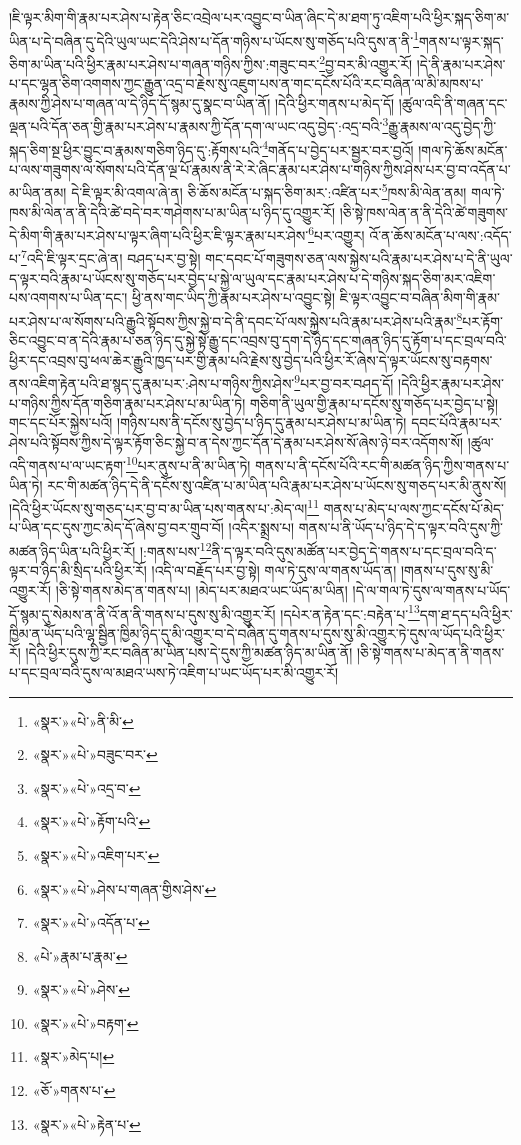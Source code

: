 །ཇི་ལྟར་མིག་གི་རྣམ་པར་ཤེས་པ་རྟེན་ཅིང་འབྲེལ་པར་འབྱུང་བ་ཡིན་ཞིང་དེ་མ་ཐག་ཏུ་འཇིག་པའི་ཕྱིར་སྐད་ཅིག་མ་ཡིན་པ་དེ་བཞིན་དུ་དེའི་ཡུལ་ཡང་དེའི་ཤེས་པ་དོན་གཉིས་པ་ཡོངས་སུ་གཅོད་པའི་དུས་ན་ནི་\footnote{«སྣར་»«པེ་»ནི་མི་}གནས་པ་ལྟར་སྐད་ཅིག་མ་ཡིན་པའི་ཕྱིར་རྣམ་པར་ཤེས་པ་གཞན་གཉིས་ཀྱིས་:གཟུང་བར་\footnote{«སྣར་»«པེ་»བཟུང་བར་}བྱ་བར་མི་འགྱུར་རོ། །དེ་ནི་རྣམ་པར་ཤེས་པ་དང་ལྷན་ཅིག་འགགས་ཀྱང་རྒྱུན་འདྲ་བ་རྗེས་སུ་འཇུག་པས་ན་གང་དངོས་པོའི་རང་བཞིན་ལ་མི་མཁས་པ་རྣམས་ཀྱི་ཤེས་པ་གཞན་ལ་དེ་ཉིད་དོ་སྙམ་དུ་སྣང་བ་ཡིན་ནོ། །དེའི་ཕྱིར་གནས་པ་མེད་དོ། །ཚུལ་འདི་ནི་གཞན་དང་ལྡན་པའི་དོན་ཅན་གྱི་རྣམ་པར་ཤེས་པ་རྣམས་ཀྱི་དོན་དག་ལ་ཡང་འདུ་བྱེད་:འདྲ་བའི་\footnote{«སྣར་»«པེ་»འདྲ་བ་}རྒྱུ་རྣམས་ལ་འདུ་བྱེད་ཀྱི་སྐད་ཅིག་སྔ་ཕྱིར་བྱུང་བ་རྣམས་གཅིག་ཉིད་དུ་:རྟོགས་པའི་\footnote{«སྣར་»«པེ་»རྟོག་པའི་}གནོད་པ་བྱེད་པར་སྦྱར་བར་བྱའོ། །གལ་ཏེ་ཆོས་མངོན་པ་ལས་གཟུགས་ལ་སོགས་པའི་དོན་ལྔ་པོ་རྣམས་ནི་རེ་རེ་ཞིང་རྣམ་པར་ཤེས་པ་གཉིས་ཀྱིས་ཤེས་པར་བྱ་བ་འདོན་པ་མ་ཡིན་ནམ། དེ་ཇི་ལྟར་མི་འགལ་ཞེ་ན། ཅི་ཆོས་མངོན་པ་སྐད་ཅིག་མར་:འཛིན་པར་\footnote{«སྣར་»«པེ་»འཇིག་པར་}ཁས་མི་ལེན་ནམ། གལ་ཏེ་ཁས་མི་ལེན་ན་ནི་དེའི་ཚེ་བདེ་བར་གཤེགས་པ་མ་ཡིན་པ་ཉིད་དུ་འགྱུར་རོ། །ཅི་སྟེ་ཁས་ལེན་ན་ནི་དེའི་ཚེ་གཟུགས་དེ་མིག་གི་རྣམ་པར་ཤེས་པ་ལྟར་ཞིག་པའི་ཕྱིར་ཇི་ལྟར་རྣམ་པར་ཤེས་\footnote{«སྣར་»«པེ་»ཤེས་པ་གཞན་གྱིས་ཤེས་}པར་འགྱུར། འོ་ན་ཆོས་མངོན་པ་ལས་:འདོད་པ་\footnote{«སྣར་»«པེ་»འདོན་པ་}འདི་ཇི་ལྟར་དྲང་ཞེ་ན། བཤད་པར་བྱ་སྟེ། གང་དབང་པོ་གཟུགས་ཅན་ལས་སྐྱེས་པའི་རྣམ་པར་ཤེས་པ་དེ་ནི་ཡུལ་ད་ལྟར་བའི་རྣམ་པ་ཡོངས་སུ་གཅོད་པར་བྱེད་པ་སྐྱེ་ལ་ཡུལ་དང་རྣམ་པར་ཤེས་པ་དེ་གཉིས་སྐད་ཅིག་མར་འཇིག་པས་འགགས་པ་ཡིན་དང་། ཕྱི་ནས་གང་ཡིད་ཀྱི་རྣམ་པར་ཤེས་པ་འབྱུང་སྟེ། ཇི་ལྟར་འབྱུང་བ་བཞིན་མིག་གི་རྣམ་པར་ཤེས་པ་ལ་སོགས་པའི་རྒྱུའི་སྟོབས་ཀྱིས་སྐྱེ་བ་དེ་ནི་དབང་པོ་ལས་སྐྱེས་པའི་རྣམ་པར་ཤེས་པའི་རྣམ་\footnote{«པེ་»རྣམ་པ་རྣམ་}པར་རྟོག་ཅིང་འབྱུང་བ་ན་དེའི་རྣམ་པ་ཅན་ཉིད་དུ་སྐྱེ་སྟེ་རྒྱུ་དང་འབྲས་བུ་དག་དེ་ཉིད་དང་གཞན་ཉིད་དུ་རྟོག་པ་དང་བྲལ་བའི་ཕྱིར་དང་འབྲས་བུ་ཕལ་ཆེར་རྒྱུའི་ཁྱད་པར་གྱི་རྣམ་པའི་རྗེས་སུ་བྱེད་པའི་ཕྱིར་རོ་ཞེས་དེ་ལྟར་ཡོངས་སུ་བརྟགས་ནས་འཇིག་རྟེན་པའི་ཐ་སྙད་དུ་རྣམ་པར་:ཤེས་པ་གཉིས་ཀྱིས་ཤེས་\footnote{«སྣར་»«པེ་»ཤེས་}པར་བྱ་བར་བཤད་དོ། །དེའི་ཕྱིར་རྣམ་པར་ཤེས་པ་གཉིས་ཀྱིས་དོན་གཅིག་རྣམ་པར་ཤེས་པ་མ་ཡིན་ཏེ། གཅིག་ནི་ཡུལ་གྱི་རྣམ་པ་དངོས་སུ་གཅོད་པར་བྱེད་པ་སྟེ། གང་དང་པོར་སྐྱེས་པའོ། །གཉིས་པས་ནི་དངོས་སུ་བྱེད་པ་ཉིད་དུ་རྣམ་པར་ཤེས་པ་མ་ཡིན་ཏེ། དབང་པོའི་རྣམ་པར་ཤེས་པའི་སྟོབས་ཀྱིས་དེ་ལྟར་རྟོག་ཅིང་སྐྱེ་བ་ན་དེས་ཀྱང་དོན་དེ་རྣམ་པར་ཤེས་སོ་ཞེས་ཉེ་བར་འདོགས་སོ། །ཚུལ་འདི་གནས་པ་ལ་ཡང་རྟག་\footnote{«སྣར་»«པེ་»བརྟག་}པར་ནུས་པ་ནི་མ་ཡིན་ཏེ། གནས་པ་ནི་དངོས་པོའི་རང་གི་མཚན་ཉིད་ཀྱིས་གནས་པ་ཡིན་ཏེ། རང་གི་མཚན་ཉིད་དེ་ནི་དངོས་སུ་འཛིན་པ་མ་ཡིན་པའི་རྣམ་པར་ཤེས་པ་ཡོངས་སུ་གཅད་པར་མི་ནུས་སོ། །དེའི་ཕྱིར་ཡོངས་སུ་གཅད་པར་བྱ་བ་མ་ཡིན་པས་གནས་པ་:མེད་ལ།\footnote{«སྣར་»མེད་པ།} གནས་པ་མེད་པ་ལས་ཀྱང་དངོས་པོ་མེད་པ་ཡིན་དང་དུས་ཀྱང་མེད་དོ་ཞེས་བྱ་བར་གྲུབ་བོ། །འདིར་སྨྲས་པ། གནས་པ་ནི་ཡོད་པ་ཉིད་དེ་ད་ལྟར་བའི་དུས་ཀྱི་མཚན་ཉིད་ཡིན་པའི་ཕྱིར་རོ། །:གནས་པས་\footnote{«ཅོ་»གནས་པ་}ནི་ད་ལྟར་བའི་དུས་མཚོན་པར་བྱེད་དེ་གནས་པ་དང་བྲལ་བའི་ད་ལྟར་བ་ཉིད་མི་སྲིད་པའི་ཕྱིར་རོ། །འདི་ལ་བརྗོད་པར་བྱ་སྟེ། གལ་ཏེ་དུས་ལ་གནས་ཡོད་ན། །གནས་པ་དུས་སུ་མི་འགྱུར་རོ། །ཅི་སྟེ་གནས་མེད་ན་གནས་པ། །མེད་པར་མཐའ་ཡང་ཡོད་མ་ཡིན། །དེ་ལ་གལ་ཏེ་དུས་ལ་གནས་པ་ཡོད་དོ་སྙམ་དུ་སེམས་ན་ནི་འོ་ན་ནི་གནས་པ་དུས་སུ་མི་འགྱུར་རོ། །དཔེར་ན་རྟེན་དང་:བརྟེན་པ་\footnote{«སྣར་»«པེ་»རྟེན་པ་}དག་ཐ་དད་པའི་ཕྱིར་ཁྱིམ་ན་ཡོད་པའི་ལྷ་སྦྱིན་ཁྱིམ་ཉིད་དུ་མི་འགྱུར་བ་དེ་བཞིན་དུ་གནས་པ་དུས་སུ་མི་འགྱུར་ཏེ་དུས་ལ་ཡོད་པའི་ཕྱིར་རོ། །དེའི་ཕྱིར་དུས་ཀྱི་རང་བཞིན་མ་ཡིན་པས་དེ་དུས་ཀྱི་མཚན་ཉིད་མ་ཡིན་ནོ། །ཅི་སྟེ་གནས་པ་མེད་ན་ནི་གནས་པ་དང་བྲལ་བའི་དུས་ལ་མཐའ་ཡས་ཏེ་འཇིག་པ་ཡང་ཡོད་པར་མི་འགྱུར་རོ། 